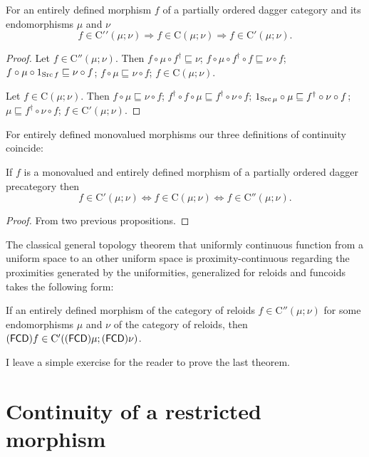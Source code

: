 \begin{prop}
For an entirely defined morphism $f$ of a partially ordered dagger
category and its endomorphisms $\mu$ and $\nu$
\[
f\in\mathrm{C'}'(\mu;\nu)\Rightarrow f\in\mathrm{C}(\mu;\nu)\Rightarrow f\in\mathrm{C}'(\mu;\nu).
\]
\end{prop}
\begin{proof}
Let $f\in\mathrm{C}''(\mu;\nu)$. Then $f\circ\mu\circ f^{\dagger}\sqsubseteq\nu$;
$f\circ\mu\circ f^{\dagger}\circ f\sqsubseteq\nu\circ f$; $f\circ\mu\circ1_{\operatorname{Src} f}\sqsubseteq\nu\circ f$;
$f\circ\mu\sqsubseteq\nu\circ f$; $f\in\mathrm{C}(\mu;\nu)$.

Let $f\in\mathrm{C}(\mu;\nu)$. Then $f\circ\mu\sqsubseteq\nu\circ f$;
$f^{\dagger}\circ f\circ\mu\sqsubseteq f^{\dagger}\circ\nu\circ f$;
$1_{\operatorname{Src}\mu}\circ\mu\sqsubseteq f^{\dagger}\circ\nu\circ f$; $\mu\sqsubseteq f^{\dagger}\circ\nu\circ f$;
$f\in\mathrm{C}'(\mu;\nu)$.
\end{proof}
For entirely defined monovalued morphisms our three definitions of
continuity coincide:
\begin{thm}
If $f$ is a monovalued and entirely defined morphism of a partially
ordered dagger precategory then
\[
f\in\mathrm{C}'(\mu;\nu)\Leftrightarrow f\in\mathrm{C}(\mu;\nu)\Leftrightarrow f\in\mathrm{C}''(\mu;\nu).
\]
\end{thm}
\begin{proof}
From two previous propositions.
\end{proof}
The classical general topology theorem that uniformly continuous function
from a uniform space to an other uniform space is proximity-continuous
regarding the proximities generated by the uniformities, generalized
for reloids and funcoids takes the following form:
\begin{thm}
If an entirely defined morphism of the category of reloids $f\in\mathrm{C}''(\mu;\nu)$
for some endomorphisms $\mu$ and $\nu$ of the category of reloids,
then $\mathsf{(\mathsf{FCD})}f\in\mathrm{C}'((\mathsf{FCD})\mu;(\mathsf{FCD})\nu)$.\end{thm}
\begin{xca}
I leave a simple exercise for the reader to prove the last theorem.
\end{xca}

\section{Continuity of a restricted
morphism}

